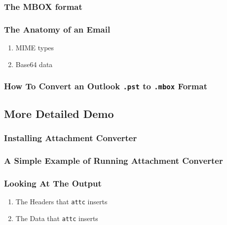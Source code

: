 \documentclass[11pt]{article}
\begin{document}
\subsubsection{The MBOX format}
\label{sec:orge0b5065}

\subsubsection{The Anatomy of an Email}
\label{sec:orge536b2c}

\begin{enumerate}
\item MIME types
\label{sec:org51b32c3}

\item Base64 data
\label{sec:org7517990}
\end{enumerate}

\subsubsection{How To Convert an Outlook \texttt{.pst} to \texttt{.mbox} Format}
\label{sec:orgbe23090}

\subsection{More Detailed Demo}
\label{sec:org020a2bc}

\subsubsection{Installing Attachment Converter}
\label{sec:org01e2528}

\subsubsection{A Simple Example of Running Attachment Converter}
\label{sec:org54c1b21}

\subsubsection{Looking At The Output}
\label{sec:orga495af6}

\begin{enumerate}
\item The Headers that \texttt{attc} inserts
\label{sec:orgea0037c}

\item The Data that \texttt{attc} inserts
\label{sec:orgc2344b1}
\end{enumerate}
\end{document}
